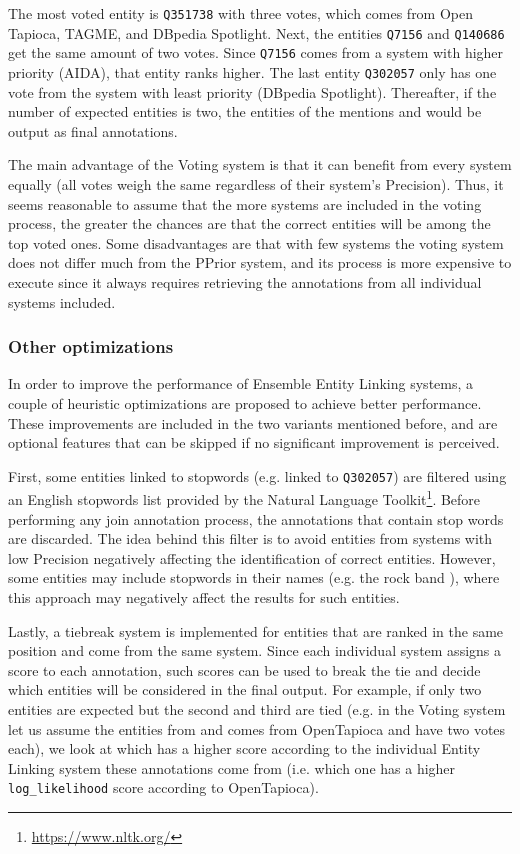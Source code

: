 The most voted entity is \texttt{Q351738} with three votes, which comes from Open Tapioca, TAGME, 
and DBpedia Spotlight. Next, the entities \texttt{Q7156} and \texttt{Q140686} get the same 
amount of two votes. Since \texttt{Q7156} comes from a system with higher priority (AIDA), that 
entity ranks higher. The last entity \texttt{Q302057} only has one vote from the system with 
least priority (DBpedia Spotlight). Thereafter, if the number of expected entities is two, the 
entities of the mentions  and  would be 
output as final annotations.

The main advantage of the Voting system is that it can benefit from every system equally (all 
votes weigh the same regardless of their system’s Precision). Thus, it seems reasonable to 
assume that the more systems are included in the voting process, the greater the chances are 
that the correct entities will be among the top voted ones. Some disadvantages are that with 
few systems the voting system does not differ much from the PPrior system, and its process is 
more expensive to execute since it always requires retrieving the annotations from all 
individual systems included.

\subsubsection{Other optimizations}
\label{cap3:system/entLinModule/ensembleSystems/optimizations}
In order to improve the performance of Ensemble Entity Linking systems, a couple of heuristic 
optimizations are proposed to achieve better performance. These improvements are included in 
the two variants mentioned before, and are optional features that can be skipped if no 
significant improvement is perceived. 

First, some entities linked to stopwords (e.g.  linked to \texttt{Q302057}) are 
filtered using an English stopwords list provided by the Natural Language Toolkit\footnote{\url{https://www.nltk.org/}}. 
Before performing any join annotation process, the annotations that contain stop words are 
discarded. The idea behind this filter is to avoid entities from systems with low Precision 
negatively affecting the identification of correct entities. However, some entities may 
include stopwords in their names (e.g. the rock band ), where this approach 
may negatively affect the results for such entities.

Lastly, a tiebreak system is implemented for entities that are ranked in the same position 
and come from the same system. Since each individual system assigns a score to each annotation, 
such scores can be used to break the tie and decide which entities will be considered in the 
final output. For example, if only two entities are expected but the second and third are 
tied (e.g. in the Voting system let us assume the entities from  
and  comes from OpenTapioca and have two votes each), we look at which 
has a higher score according to the individual Entity Linking system these annotations come from 
(i.e. which one has a higher \texttt{log\_likelihood} score according to OpenTapioca). 

